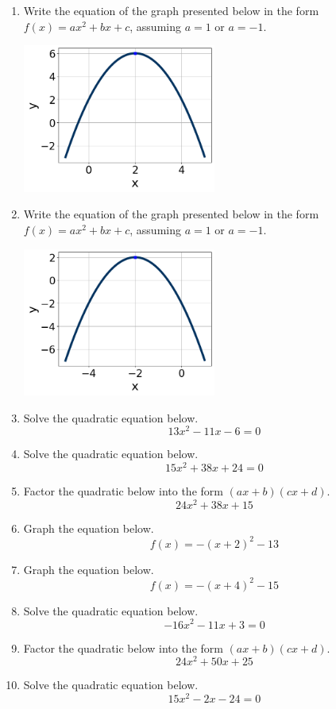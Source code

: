 \documentclass[14pt]{extbook}
\begin{document}
\begin{enumerate}
\item{
Write the equation of the graph presented below in the form $f(x)=ax^2+bx+c$, assuming  $a=1$ or $a=-1$.
\begin{center}
    \includegraphics[width=0.5\textwidth]{../Figures/quadraticGraphToEquationCopyB.png}
\end{center}
} \newpage
\item{
Write the equation of the graph presented below in the form $f(x)=ax^2+bx+c$, assuming  $a=1$ or $a=-1$.
\begin{center}
    \includegraphics[width=0.5\textwidth]{../Figures/quadraticGraphToEquationB.png}
\end{center}
} \newpage
\item{
Solve the quadratic equation below.\[ 13x^{2} -11 x -6 = 0 \]} \newpage
\item{
Solve the quadratic equation below.\[ 15x^{2} +38 x + 24 = 0 \]} \newpage
\item{
Factor the quadratic below into the form $(ax+b)(cx+d)$.\[ 24x^{2} +38 x + 15 \]} \newpage
\item{
Graph the equation below.\[ f(x) = -(x+2)^2 - 13 \]} \newpage
\item{
Graph the equation below.\[ f(x) = -(x+4)^2 - 15 \]} \newpage
\item{
Solve the quadratic equation below.\[ -16x^{2} -11 x + 3 = 0 \]} \newpage
\item{
Factor the quadratic below into the form $(ax+b)(cx+d)$.\[ 24x^{2} +50 x + 25 \]} \newpage
\item{
Solve the quadratic equation below.\[ 15x^{2} -2 x -24 = 0 \]} \newpage
\end{enumerate}
\end{document}
